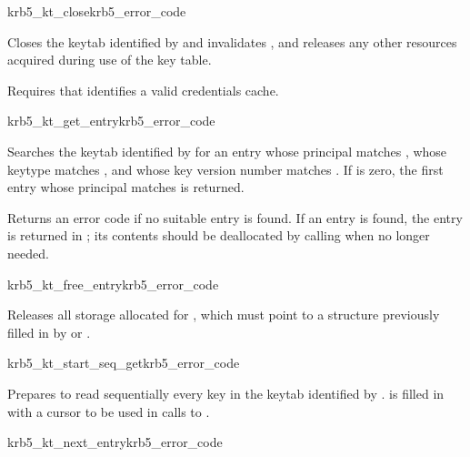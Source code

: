 \begin{funcdecl}{krb5_kt_close}{krb5_error_code}{\funcin}
\end{funcdecl}

Closes the keytab identified by  and invalidates
, and releases any other resources acquired during use of
the key table.

Requires that  identifies a valid credentials cache.

\begin{funcdecl}{krb5_kt_get_entry}{krb5_error_code}{\funcin}
\funcout
{}
\end{funcdecl}

Searches the keytab identified by  for an entry whose
principal matches , whose keytype matches 
, and
whose key version number matches .  If  is
zero, the first entry whose principal matches is returned.

Returns an error code if no suitable entry is found.  If an entry is
found, the entry is returned in ; its contents should
be deallocated by calling  when no longer
needed.

\begin{funcdecl}{krb5_kt_free_entry}{krb5_error_code}{\funcinout}
\end{funcdecl}

Releases all storage allocated for , which must point
to a structure previously filled in by  or
.

\begin{funcdecl}{krb5_kt_start_seq_get}{krb5_error_code}{\funcin}
\funcout
{}
\end{funcdecl}

Prepares to read sequentially every key in the keytab identified by
.
 is filled in with a cursor to be used in calls to
.

\begin{funcdecl}{krb5_kt_next_entry}{krb5_error_code}{\funcin}
\funcout
{}
\funcinout
{}
\end{funcdecl}

